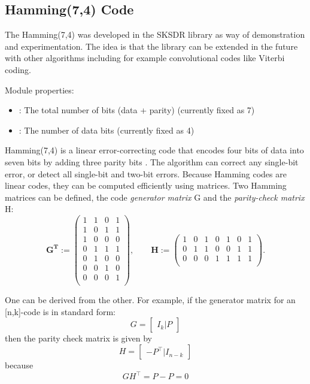 \subsection{Hamming(7,4) Code}

The Hamming(7,4) was developed in the SKSDR library as way of demonstration and experimentation. The idea is that the library can be extended in the future with other algorithms including for example convolutional codes like Viterbi coding.

\noindent Module properties:
\begin{itemize}
  \item {}: The total number of bits (data + parity) (currently fixed as 7)
  \item {}: The number of data bits (currently fixed as 4)
\end{itemize}

Hamming(7,4) is a linear error-correcting code that encodes four bits of data into seven bits by adding three parity bits \cite{wikipedia_hamming}. The algorithm can correct any single-bit error, or detect all single-bit and two-bit errors. Because Hamming codes are linear codes, they can be computed efficiently using matrices. Two Hamming matrices can be defined, the code \emph{generator matrix} G and the \emph{parity-check matrix} H:
\begin{equation}
\mathbf{G^T} := \begin{pmatrix}
  1 & 1 & 0 & 1 \\
  1 & 0 & 1 & 1 \\
  1 & 0 & 0 & 0 \\
  0 & 1 & 1 & 1 \\
  0 & 1 & 0 & 0 \\
  0 & 0 & 1 & 0 \\
  0 & 0 & 0 & 1 \\
 \end{pmatrix}, \qquad \mathbf{H} := \begin{pmatrix}
  1 & 0 & 1 & 0 & 1 & 0 & 1 \\
  0 & 1 & 1 & 0 & 0 & 1 & 1 \\
  0 & 0 & 0 & 1 & 1 & 1 & 1 \\
 \end{pmatrix}.
\end{equation}

One can be derived from the other. For example, if the generator matrix for an [n,k]-code is in standard form:
\begin{equation}
  G = \begin{bmatrix} I_k | P \end{bmatrix}
\end{equation}
then the parity check matrix is given by
\begin{equation}
  H = \begin{bmatrix} -P^{\top} | I_{n-k} \end{bmatrix}
\end{equation}
because
\begin{equation}
G H^{\top} = P-P = 0
\end{equation}

